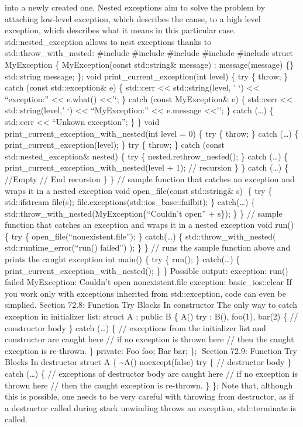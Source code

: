 into a newly created one. Nested exceptions aim to solve the problem by
attaching low-level exception, which describes the cause, to a high
level exception, which describes what it means in this particular case.
std::nested\_exception allows to nest exceptions thanks to
std::throw\_with\_nested: \#include \#include \#include \#include
\#include struct MyException \{ MyException(const std::string\& message)
: message(message) \{\} std::string message; \}; void
print\_current\_exception(int level) \{ try \{ throw; \} catch (const
std::exception\& e) \{ std::cerr \textless\textless{} std::string(level,
' `) \textless\textless{} ``exception:'' \textless\textless{} e.what()
\textless\textless{}'\n`; \} catch (const MyException\& e) \{ std::cerr
\textless\textless{} std::string(level,' `) \textless\textless{}
``MyException:'' \textless\textless{} e.message
\textless\textless{}'\n'; \} catch (\ldots) \{ std::cerr
\textless\textless{} ``Unkown exception\n''; \} \} void
print\_current\_exception\_with\_nested(int level = 0) \{ try \{ throw;
\} catch (\ldots) \{ print\_current\_exception(level); \} try \{ throw;
\} catch (const std::nested\_exception\& nested) \{ try \{
nested.rethrow\_nested(); \} catch (\ldots) \{
print\_current\_exception\_with\_nested(level + 1); // recursion \} \}
catch (\ldots) \{ //Empty // End recursion \} \} // sample function that
catches an exception and wraps it in a nested exception void
open\_file(const std::string\& s) \{ try \{ std::ifstream file(s);
file.exceptions(std::ios\_base::failbit); \} catch(\ldots) \{
std::throw\_with\_nested(MyException\{``Couldn't open'' + s\}); \} \} //
sample function that catches an exception and wraps it in a nested
exception void run() \{ try \{ open\_file(``nonexistent.file''); \}
catch(\ldots) \{ std::throw\_with\_nested( std::runtime\_error(``run()
failed'') ); \} \} // runs the sample function above and prints the
caught exception int main() \{ try \{ run(); \} catch(\ldots) \{
print\_current\_exception\_with\_nested(); \} \} Possible output:
exception: run() failed MyException: Couldn't open nonexistent.file
exception: basic\_ios::clear If you work only with exceptions inherited
from std::exception, code can even be simplied. Section 72.8: Function
Try Blocks In constructor The only way to catch exception in initializer
list: struct A : public B \{ A() try : B(), foo(1), bar(2) \{ //
constructor body \} catch (\ldots) \{ // exceptions from the initializer
list and constructor are caught here // if no exception is thrown here
// then the caught exception is re-thrown. \} private: Foo foo; Bar bar;
\}; Section 72.9: Function Try Blocks In destructor struct A \{
\textasciitilde A() noexcept(false) try \{ // destructor body \} catch
(\ldots) \{ // exceptions of destructor body are caught here // if no
exception is thrown here // then the caught exception is re-thrown. \}
\}; Note that, although this is possible, one needs to be very careful
with throwing from destructor, as if a destructor called during stack
unwinding throws an exception, std::terminate is called.

